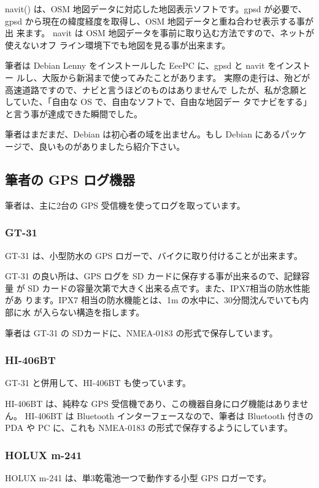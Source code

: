 \documentclass[mingoth,a4paper]{jsarticle}
\begin{document}
navit() は、OSM 地図データに対応した地図表示ソフトです。gpsd が必要で、
gpsd から現在の緯度経度を取得し、OSM 地図データと重ね合わせ表示する事が出
来ます。
navit は OSM 地図データを事前に取り込む方法ですので、ネットが使えないオフ
ライン環境下でも地図を見る事が出来ます。

筆者は Debian Lenny をインストールした EeePC に、gpsd と navit をインストー
ルし、大阪から新潟まで使ってみたことがあります。
実際の走行は、殆どが高速道路ですので、ナビと言うほどのものはありませんで
したが、私が念願としていた、「自由な OS で、自由なソフトで、自由な地図デー
タでナビをする」と言う事が達成できた瞬間でした。

筆者はまだまだ、Debian は初心者の域を出ません。もし Debian にあるパッケージで、良いものがありましたら紹介下さい。

\subsection{筆者の GPS ログ機器}

筆者は、主に2台の GPS 受信機を使ってログを取っています。

\subsubsection{GT-31}

GT-31 は、小型防水の GPS ロガーで、バイクに取り付けることが出来ます。

GT-31 の良い所は、GPS ログを SD カードに保存する事が出来るので、記録容量
が SD カードの容量次第で大きく出来る点です。また、IPX7相当の防水性能があ
ります。IPX7 相当の防水機能とは、1m の水中に、30分間沈んでいても内部に水
が入らない構造を指します。

筆者は GT-31 の SDカードに、NMEA-0183 の形式で保存しています。

\subsubsection{HI-406BT}

GT-31 と併用して、HI-406BT も使っています。

HI-406BT は、純粋な GPS 受信機であり、この機器自身にログ機能はありません。
HI-406BT は Bluetooth インターフェースなので、筆者は Bluetooth 付きの
PDA や PC に、これも NMEA-0183 の形式で保存するようにしています。

\subsubsection{HOLUX m-241}
HOLUX m-241 は、単3乾電池一つで動作する小型 GPS ロガーです。
\end{document}

